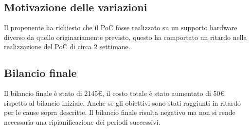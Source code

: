 \subsection{Motivazione delle variazioni}
Il proponente ha richiesto che il PoC fosse realizzato su un supporto hardware diverso da quello originariamente previsto, questo ha comportato un ritardo nella realizzazione del PoC di circa 2 settimane.

\subsection{Bilancio finale}
Il bilancio finale è stato di 2145€, il costo totale è stato aumentato di 50€ rispetto al bilancio iniziale. Anche se gli obiettivi sono stati raggiunti in ritardo per le cause sopra descritte. Il bilancio finale risulta negativo ma non si rende necessaria una ripianificazione dei periodi successivi.